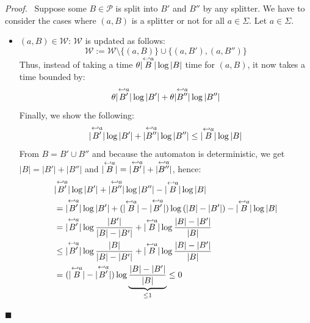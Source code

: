 \documentclass[12pt, a4 paper]{article}
\renewenvironment{proof}[1][Proof]{\begin{mdframed}[backgroundcolor=black!5, topline=false, rightline=false, bottomline=false, linecolor=black!15, linewidth=3pt]{\noindent\textit{#1.}\ }}{\noindent\par\hfill$\blacksquare$\end{mdframed}}
\theoremstyle{definition}
\begin{document}
\begin{proof}
    Suppose some $B \in \mathcal{P}$ is split into $B'$ and $B''$ by any splitter.
    We have to consider the cases where $(a , B)$ is a splitter or not for all $a \in \Sigma$.
    Let $a \in \Sigma$.
    \begin{itemize}
        \item $(a, B) \in \mathcal{W}$: $\mathcal{W}$ is updated as follows:
        $$ \mathcal{W} := \mathcal{W} \setminus \{(a, B)\} \cup \{(a, B'), (a, B'')\}$$
        Thus, instead of taking a time $\theta | \overset{\hookleftarrow {a}}{B} | \log | B |$ time for $(a, B)$, it now takes a time bounded by:
        $$\theta | \overset{\hookleftarrow {a}}{B'} | \log | B' | + \theta | \overset{\hookleftarrow {a}}{B''} | \log | B'' |$$
        Finally, we show the following:
        \begin{equation*}
            | \overset{\hookleftarrow {a}}{B'} | \log | B' | + | \overset{\hookleftarrow {a}}{B''} | \log | B'' | \leq | \overset{\hookleftarrow {a}}{B} | \log | B |
        \end{equation*}
        From $B = B' \cup B''$ and because the automaton is deterministic, we get $|B| = |B'| + |B''|$ and $| \overset{\hookleftarrow {a}}{B} | = | \overset{\hookleftarrow {a}}{B'} | + | \overset{\hookleftarrow {a}}{B''} |$, hence:
        \begin{align*}
            & |\overset{\hookleftarrow {a}}{B'} | \log | B' | + | \overset{\hookleftarrow {a}}{B''} | \log | B'' | - | \overset{\hookleftarrow {a}}{B} | \log | B | \\
            &= | \overset{\hookleftarrow {a}}{B'} | \log | B' | + (| \overset{\hookleftarrow {a}}{B} | - | \overset{\hookleftarrow {a}}{B'}|) \log \left(|B|-|B'|\right) - | \overset{\hookleftarrow {a}}{B} | \log | B | \\
            &= | \overset{\hookleftarrow {a}}{B'} | \log \frac{|B'|}{|B|-|B'|} + | \overset{\hookleftarrow {a}}{B} | \log \frac{|B|-|B'|}{|B|} \\
            &\leq | \overset{\hookleftarrow {a}}{B'} | \log \frac{|B|}{|B|-|B'|} + | \overset{\hookleftarrow {a}}{B} | \log \frac{|B|-|B'|}{|B|} \\
            &= (| \overset{\hookleftarrow {a}}{B}| - |\overset{\hookleftarrow {a}}{B'} |) \log \underset{\leq 1}{\underbrace{\frac{|B|-|B'|}{|B|}}} \leq 0
        \end{align*}


\end{itemize}
\end{proof}
\end{document}
